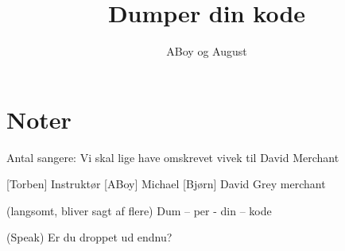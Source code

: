 \documentclass[a4paper,11pt]{article}
\title{Dumper din kode}
\author{ABoy og August}
\begin{document}
\maketitle

\section*{Noter}
Antal sangere: Vi skal lige have omskrevet vivek til David Merchant

\begin{roles}
[Torben] Instruktør
[ABoy] Michael
[Bjørn] David Grey merchant
\end{roles}

\begin{sketch}

(langsomt, bliver sagt af flere) Dum – per - din – kode

(Speak) Er du droppet ud endnu?
\end{sketch}
\end{document}
